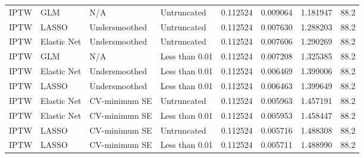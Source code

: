 \begin{longtable}[l]{llllllll}
IPTW & GLM & N/A & Untruncated & 0.112524 & 0.009064 & 1.181947 & 88.2\\
IPTW & LASSO & Undersmoothed & Untruncated & 0.112524 & 0.007630 & 1.288203 & 88.2\\
IPTW & Elastic Net & Undersmoothed & Untruncated & 0.112524 & 0.007606 & 1.290269 & 88.2\\
IPTW & GLM & N/A & Less than 0.01 & 0.112524 & 0.007208 & 1.325385 & 88.2\\
IPTW & Elastic Net & Undersmoothed & Less than 0.01 & 0.112524 & 0.006469 & 1.399006 & 88.2\\
IPTW & LASSO & Undersmoothed & Less than 0.01 & 0.112524 & 0.006463 & 1.399649 & 88.2\\
IPTW & Elastic Net & CV-minimum SE & Untruncated & 0.112524 & 0.005963 & 1.457191 & 88.2\\
IPTW & Elastic Net & CV-minimum SE & Less than 0.01 & 0.112524 & 0.005953 & 1.458447 & 88.2\\
IPTW & LASSO & CV-minimum SE & Untruncated & 0.112524 & 0.005716 & 1.488308 & 88.2\\
IPTW & LASSO & CV-minimum SE & Less than 0.01 & 0.112524 & 0.005711 & 1.488990 & 88.2\\
\bottomrule
\end{longtable}
